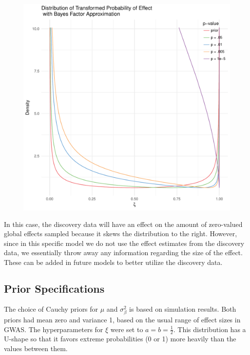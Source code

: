 \documentclass[AMA,STIX1COL]{WileyNJD-v2}\usepackage[]{graphicx}\usepackage[]{color}
\makeatletter
\def\maxwidth{ %
  \ifdim\Gin@nat@width>\linewidth
    \linewidth
  \else
    \Gin@nat@width
  \fi
}
\newenvironment{knitrout}{}{} %
\makeatother
\begin{document}
\begin{figure}
\begin{knitrout}
\color{fgcolor}
\includegraphics[width=\maxwidth]{figure/unnamed-chunk-7-1} 

\end{knitrout}
\end{figure}

In this case, the discovery data will have an effect on the amount of zero-valued global effects sampled because it skews the distribution to the right. However, since in this specific model we do not use the effect estimates from the discovery data, we essentially throw away any information regarding the size of the effect. These can be added in future models to better utilize the discovery data.


\subsection{Prior Specifications}


The choice of Cauchy priors for $\mu$ and $\sigma^2_{\beta}$ is based on simulation results. Both priors had mean zero and variance 1, based on the usual range of effect sizes in GWAS. The hyperparameters for $\xi$ were set to $a = b= \frac{1}{2}$. This distribution has a U-shape so that it favors extreme probabilities (0 or 1) more heavily than the values between them. 
\end{document}

